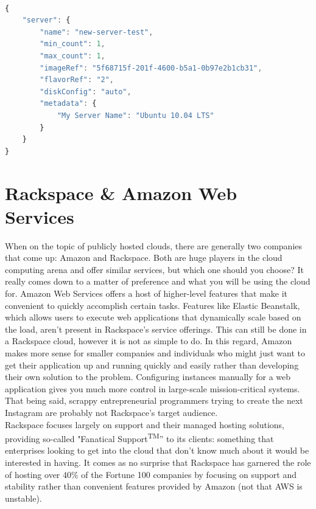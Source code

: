 \documentclass[DIV=calc, paper=letter, fontsize=12pt, twocolumn]{scrartcl}	 %
\begin{document}
\vfill

\pagebreak

\begin{lstlisting}[language={JavaScript},caption={A JSON object directing the Rackspace API to create a new Ubuntu server.},label={code:sample}]

{
    "server": {
        "name": "new-server-test",
        "min_count": 1,
        "max_count": 1,
        "imageRef": "5f68715f-201f-4600-b5a1-0b97e2b1cb31",
        "flavorRef": "2",
        "diskConfig": "auto",
        "metadata": {
            "My Server Name": "Ubuntu 10.04 LTS"
        }
    }
}

\end{lstlisting}

\section*{Rackspace \& Amazon Web Services}

When on the topic of publicly hosted clouds, there are generally two
companies that come up: Amazon and Rackspace. Both are huge players
in the cloud computing arena and offer similar services, but which one 
should you choose? It really comes down to a matter of preference and
what you will be using the cloud for. Amazon Web Services offers a host
of higher-level features that make it convenient to quickly accomplish
certain tasks. Features like Elastic Beanstalk, which allows users to
execute web applications that dynamically scale based on the load, aren't
present in Rackspace's service offerings. This can still be done in
a Rackspace cloud, however it is not as simple to do. In this regard,
Amazon makes more sense for smaller companies and individuals who might
just want to get their application up and running quickly and easily
rather than developing their own solution to the problem. Configuring
instances manually for a web application gives you much more control in
large-scale mission-critical systems. That being said, scrappy 
entrepreneurial programmers trying to create the next Instagram are probably
not Rackspace's target audience.
\\

Rackspace focuses largely on support
and their managed hosting solutions, providing so-called "Fanatical
Support\textsuperscript{TM}'' to its clients: something that enterprises looking to
get into the cloud that don't know much about it would be interested
in having. It comes as no surprise that Rackspace has garnered the role
of hosting over 40\% of the Fortune 100 companies\cite{ref:rackspaceMain} by focusing on 
support and stability rather than convenient features provided by
Amazon (not that AWS is unstable).
\\
\end{document}
